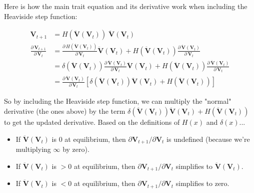 Here is how the main trait equation and its derivative work when including the
Heaviside step function:



\begin{align}
    \mathbf{V}_{t+1} &= H(\mathbf{\ddot{V}}(\mathbf{V}_t)) \;
        \mathbf{\ddot{V}}(\mathbf{V}_t) \\
    \frac{ \partial \, \mathbf{V}_{t+1}}{ \partial \, \mathbf{V}_{t} } &=
        \frac{ \partial \, H(\mathbf{\ddot{V}}(\mathbf{V}_t))}{
            \partial \, \mathbf{V}_{t} }
            \mathbf{\ddot{V}}(\mathbf{V}_t) +
        H(\mathbf{\ddot{V}}(\mathbf{V}_t))
        \frac{ \partial \, \mathbf{\ddot{V}}(\mathbf{V}_t) }{
            \partial \, \mathbf{V}_{t} } \\
    &= \delta(\mathbf{\ddot{V}}(\mathbf{V}_t))
        \frac{ \partial \, \mathbf{\ddot{V}}(\mathbf{V}_t) }{
            \partial \, \mathbf{V}_{t} }
        \mathbf{\ddot{V}}(\mathbf{V}_t) +
        H(\mathbf{\ddot{V}}(\mathbf{V}_t))
        \frac{ \partial \, \mathbf{\ddot{V}}(\mathbf{V}_t) }{
            \partial \, \mathbf{V}_{t} } \\
    &= \frac{ \partial \, \mathbf{\ddot{V}}(\mathbf{V}_t) }{
            \partial \, \mathbf{V}_{t} }
        \left[
            \delta(\mathbf{\ddot{V}}(\mathbf{V}_t))
            \mathbf{\ddot{V}}(\mathbf{V}_t) +
            H(\mathbf{\ddot{V}}(\mathbf{V}_t))
        \right]
\end{align}



So by including the Heaviside step function, we can multiply the "normal"
derivative (the ones above) by the term
$\delta(\mathbf{\ddot{V}}(\mathbf{V}_t)) \mathbf{\ddot{V}}(\mathbf{V}_t) +
H(\mathbf{\ddot{V}}(\mathbf{V}_t))$ to get the updated derivative.
Based on the definitions of $H(x)$ and $\delta(x)$...

\begin{itemize}
    \item If $\mathbf{\ddot{V}}(\mathbf{V}_t)$ is 0 at equilibrium, then
        $\partial \mathbf{V}_{t+1} / \partial \mathbf{V}_{t}$
        is undefined (because we're multiplying $\infty$ by zero).
    \item If $\mathbf{\ddot{V}}(\mathbf{V}_t)$ is $> 0$ at equilibrium, then
        $\partial \mathbf{V}_{t+1} / \partial \mathbf{V}_{t}$
        simplifies to $\mathbf{\ddot{V}}(\mathbf{V}_t)$.
    \item If $\mathbf{\ddot{V}}(\mathbf{V}_t)$ is $< 0$ at equilibrium, then
        $\partial \mathbf{V}_{t+1} / \partial \mathbf{V}_{t}$
        simplifies to zero.
\end{itemize}


